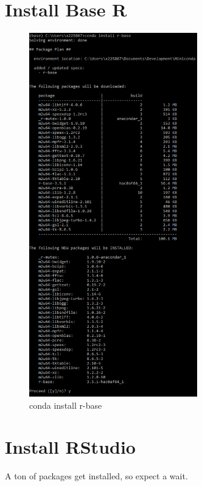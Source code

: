 \documentclass{report}
\begin{document}
\section*{Install Base R}

\begin{figure}[H]
\centering
\includegraphics[width=0.65\textwidth]{./images/r_install.PNG}
\caption{conda install r-base}
\end{figure}

\section*{Install RStudio}

A ton of packages get installed, so expect a wait.
\end{document}
